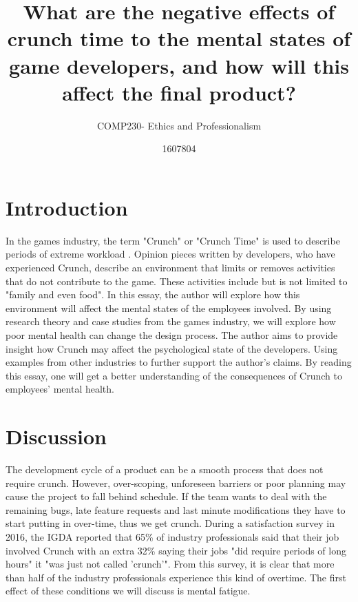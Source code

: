 \documentclass{scrartcl}
\title{What are the negative effects of crunch time to the mental states of game developers, and how will this affect the final product? }
\subtitle{COMP230- Ethics and Professionalism}
\author{1607804}
\begin{document}
\maketitle


\section{Introduction}In the games industry, the term "Crunch" or "Crunch Time" is used to describe periods of extreme workload \cite[p. 468]{edholm2017crunch}. Opinion pieces written by developers, who have experienced Crunch, describe an environment that limits or removes activities that do not contribute to the game. These activities include but is not limited to "family and even food"\cite{schreier_2017}. In this essay, the author will explore how this environment will affect the mental states of the employees involved. By using research theory and case studies from the games industry, we will explore how poor mental health can change the design process.  The author aims to provide insight how Crunch may affect the psychological state of the developers. Using examples from other industries to further support the author's claims. By reading this essay, one will get a better understanding of the consequences of Crunch to employees' mental health. 

\section{Discussion}
The development cycle of a product can be a smooth process that does not require crunch. However,  over-scoping, unforeseen barriers or poor planning may cause the project to fall behind schedule. If the team wants to deal with the remaining bugs, late feature requests and last minute modifications they have to start putting in over-time, thus we get crunch\cite{onlineWebl}\cite{edholm2017crunch}. During a satisfaction survey in 2016, the IGDA reported that 65\%  of industry professionals said that their job involved Crunch with an extra 32\%  saying their jobs "did require periods of long hours" it "was just not called 'crunch'"\cite[p.20]{weststarlegault2016}. From this survey, it is clear that more than half of the industry professionals experience this kind of overtime. The first effect of these conditions we will discuss is mental fatigue.
\end{document}
